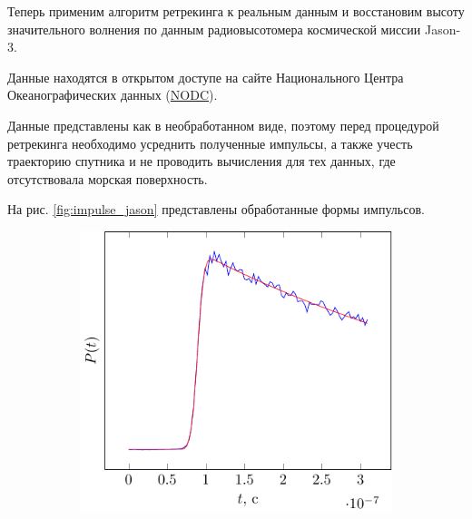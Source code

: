 Теперь применим алгоритм ретрекинга к реальным данным и восстановим высоту
значительного волнения по данным радиовысотомера космической миссии Jason-3. 

Данные находятся в открытом доступе на сайте Национального Центра
Океанографических данных
(\href{https://data.nodc.noaa.gov/jason3/gdr}{NODC}). 


Данные представлены как в необработанном виде, поэтому перед процедурой ретрекинга необходимо усреднить полученные импульсы, а также учесть траекторию спутника и
не проводить вычисления для тех данных, где отсутствовала морская поверхность.


На рис. \ref{fig:impulse_jason} представлены обработанные формы импульсов. 
\begin{figure}[ht]
    \centering
    \begin{subfigure}{0.49\linewidth}
        \centering
        \includegraphics[width=\linewidth, page=1]{fig/retracking/real}
    \end{subfigure}
    \begin{subfigure}{0.49\linewidth}
        \centering

\end{subfigure}
\end{figure}
